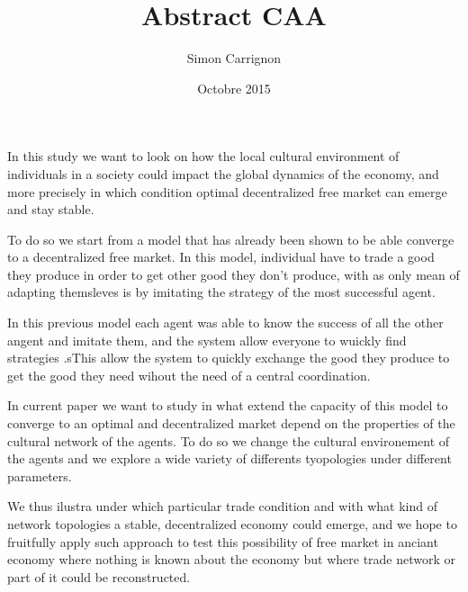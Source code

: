 \documentclass[a4paper]{article}
\title{Abstract CAA}
\author{Simon Carrignon}
\date{Octobre 2015}
\begin{document}
In this study we want to look on how the local cultural environment of individuals in a society could impact the global dynamics of the economy, and more precisely in which condition optimal decentralized free market can emerge and stay stable.

To do so we start from a model that has already been shown to be able converge to a decentralized free market. In this model, individual have to trade a good they produce in order to get other good they don't produce, with as only mean of adapting themsleves is by imitating the strategy of the most successful agent. 

In this previous model each agent was able to know the success of all the other angent and imitate them, and the system allow everyone to wuickly find strategies .sThis allow the system to quickly  exchange the good they produce to get the good they need wihout the need of a central coordination. 

In current paper we want to study in what extend the capacity of this model to converge to an optimal and decentralized market depend on the properties of the cultural network of the agents. To do so we change the cultural environement of the agents and we explore a wide variety of differents tyopologies under different parameters.

We thus ilustra under which particular trade condition and with what kind of network topologies a stable, decentralized economy could emerge, and we hope to fruitfully apply such approach to test this possibility of free market in anciant economy where nothing is known about the economy but where trade network or part of it could be reconstructed.
\end{document}
